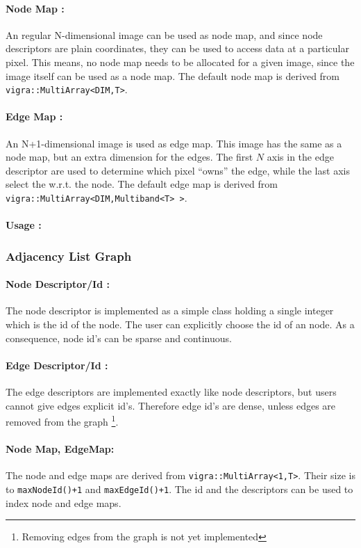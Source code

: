 \paragraph{Node Map :} An regular N-dimensional image can
be used as node map, and since node descriptors are plain
coordinates, they can be used to access data at a
particular pixel.
This means, no node map needs to be allocated for a given
image, since the image itself can be used as a node map.
The default node map is derived from \lstinline{vigra::MultiArray<DIM,T>}.

\paragraph{Edge Map :} An N+1-dimensional image is
used as edge map.
This image has the same as a node map, but an extra
dimension for the edges.
The first $N$ axis in the edge descriptor are 
used to determine which pixel ``owns'' the edge,
while the last axis select the w.r.t. the node.
The default edge map is derived from \lstinline{vigra::MultiArray<DIM,Multiband<T> >}.

\paragraph{Usage :}

\subsubsection{Adjacency List Graph} \label{sec:graphs_adjacency_list_graph}

\paragraph{Node Descriptor/Id :}
The node descriptor is implemented as a simple class
holding a single integer which is the id 
of the node.
The user can explicitly choose the id of
an node. As a consequence, node id's can 
be sparse and continuous.

\paragraph{Edge Descriptor/Id :}
The edge descriptors are implemented exactly like
node descriptors, but users cannot give
edges explicit id's.
Therefore edge id's are dense, unless
edges are removed from the graph \footnote{Removing edges from the graph is
not yet implemented}.

\paragraph{Node Map, EdgeMap:} 
The node and edge maps are derived from \lstinline{vigra::MultiArray<1,T>}.
Their size is to \lstinline{maxNodeId()+1} and  \lstinline{maxEdgeId()+1}.
The id and the descriptors can be used to index node and edge maps.


